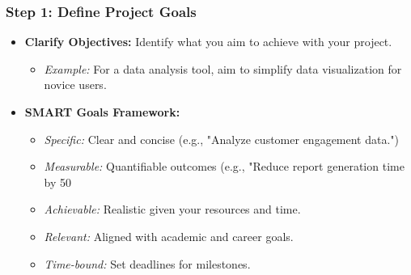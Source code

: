 \documentclass[aspectratio=169]{beamer}
\begin{document}
\begin{frame}[fragile]
    \frametitle{Step 1: Define Project Goals}
    \begin{itemize}
        \item \textbf{Clarify Objectives:} Identify what you aim to achieve with your project.
        \begin{itemize}
            \item \textit{Example:} For a data analysis tool, aim to simplify data visualization for novice users.
        \end{itemize}
        \item \textbf{SMART Goals Framework:}
        \begin{itemize}
            \item \textit{Specific:} Clear and concise (e.g., "Analyze customer engagement data.")
            \item \textit{Measurable:} Quantifiable outcomes (e.g., "Reduce report generation time by 50%
            \item \textit{Achievable:} Realistic given your resources and time.
            \item \textit{Relevant:} Aligned with academic and career goals.
            \item \textit{Time-bound:} Set deadlines for milestones.
        \end{itemize}
    \end{itemize}
\end{frame}
\end{document}
